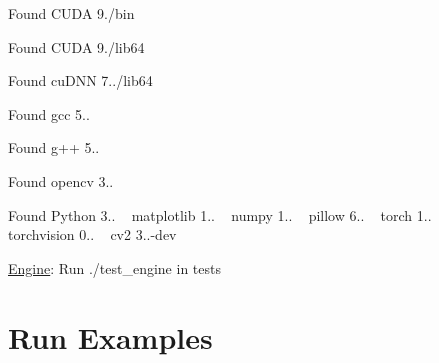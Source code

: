 \begin{DoxyItemize}
\begin{DoxyEnumerate}
\begin{DoxyItemize}
\item Found C\+U\+DA 9./bin
\item Found C\+U\+DA 9./lib64
\item Found cu\+D\+NN 7../lib64
\item Found gcc 5..
\item Found g++ 5..
\item Found opencv 3..
\item Found Python 3.. ~\newline
 matplotlib 1.. ~\newline
 numpy 1.. ~\newline
 pillow 6.. ~\newline
 torch 1.. ~\newline
 torchvision 0.. ~\newline
 cv2 3..-\/dev ~\newline

\end{DoxyItemize}
\item \hyperlink{classEngine}{Engine}\+: Run ./test\+\_\+engine in tests
\end{DoxyEnumerate}
\end{DoxyItemize}\hypertarget{index_examples_sec}{}\section{Run Examples}\label{index_examples_sec}
